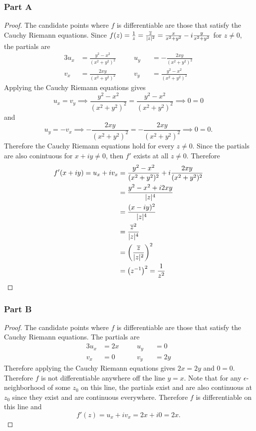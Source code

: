 \documentclass[12pt,titlepage]{extarticle}
\begin{document}
\subsubsection*{Part A}
\begin{proof}
    The candidate points where $f$ is differentiable are those that satisfy the Cauchy Riemann equations. Since $f(z) = \frac{1}{z} = \frac{\overline{z}}{|z|^2} = \frac{x}{x^2 + y^2} - i \frac{y}{x^2 + y^2}$ for $z \neq 0$, the partials are
    \begin{alignat*}{3}
        u_x &= \frac{y^2 - x^2}{(x^2 + y^2)^2} &\quad& u_y &&= -\frac{2xy}{(x^2 + y^2)^2} \\
        v_x &= \frac{2xy}{(x^2 + y^2)^2} && v_y &&= \frac{y^2 - x^2}{(x^2 + y^2)^2}
    \end{alignat*}
    Applying the Cauchy Riemann equations gives
    \[
        u_x = v_y \implies \frac{y^2 - x^2}{(x^2 + y^2)^2} = \frac{y^2 - x^2}{(x^2 + y^2)^2} \implies 0 = 0
    \]
    and
    \[
        u_y = -v_x \implies -\frac{2xy}{(x^2 + y^2)^2} = -\frac{2xy}{(x^2 + y^2)^2} \implies 0 = 0
    .\]
    Therefore the Cauchy Riemann equations hold for every $z \neq 0$. Since the partials are also conintuous for $x +iy \neq 0$, then $f'$ exists at all $z \neq 0$. Therefore
    \begin{align*}
        f'(x+iy) = u_x + iv_x &= \frac{y^2 - x^2}{(x^2 + y^2)^2} + i \frac{2xy}{(x^2 + y^2)^2} \\
        &= \frac{y^2 - x^2 + i 2xy}{|z|^4} \\
        &= \frac{(x -iy)^2}{|z|^4}  \\
        &= \frac{\overline{z}^2}{|z|^4} \\
        &= \qty(\frac{\overline{z}}{|z|^2})^2 \\
        &= \qty(z^{-1})^2 = \frac{1}{z^2}
    \end{align*}
\end{proof}

\subsubsection*{Part B}
\begin{proof}
    The candidate points where $f$ is differentiable are those that satisfy the Cauchy Riemann equations. The partials are
    \begin{alignat*}{3}
        u_x &= 2x &\quad& u_y &&= 0 \\
        v_x &= 0 && v_y &&= 2y
    \end{alignat*}
    Therefore applying the Cauchy Riemann equations gives $2x = 2y$ and $0 = 0$. Therefore $f$ is not differentiable anywhere off the line $y = x$. Note that for any $\epsilon$-neighborhood of some $z_0$ on this line, the partials exist and are also continuous at $z_0$ since they exist and are continuous everywhere. Therefore $f$ is differentiable on this line and
    \[
        f'(z) = u_x + i v_x = 2x + i 0 = 2x
    .\]
\end{proof}
\end{document}
